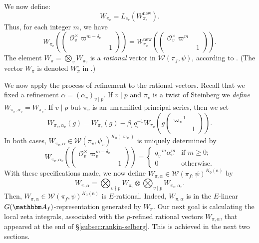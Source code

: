 \documentclass[10pt, twoside]{amsart}
\theoremstyle{plain}
\theoremstyle{definition}
\theoremstyle{remark}
\numberwithin{equation}{subsection}
\def\A{\mathbbm A}
\def\new{\mathrm{new}}
\def\gn{\mathfrak n}
\def\scro{\mathscr O}
\def\calw{\mathcal W}
\def\scro{\mathscr O}
\begin{document}
We now define:
\begin{equation*}
W_{\pi_v} = L_{c_v}(W_{\pi_v}^{\new}).
\end{equation*}
Thus, for each integer $m$, we have
\begin{equation*}
W_{\pi_v}\left(\begin{pmatrix}\scro_v^\times \varpi^{m-\delta_v} & \\ & 1 \end{pmatrix}\right) = W_{\pi_v}^{\new}\left(\begin{pmatrix}\scro_v^\times \varpi^{m} & \\ & 1 \end{pmatrix}\right).
\end{equation*}
The element $W_{\pi} = \bigotimes_v W_{\pi_v}$ is a {\em rational} vector in $\calw(\pi_f,\psi)$, according to \cite[Proposition 3.14]{RaTa}.  (The vector $W_{\pi}$ is denoted $W^{\circ}_{\pi}$ in \cite{RaTa}.)

We now apply the process of refinement to the rational vectors. Recall that we fixed a refinement $\alpha = (\alpha_{v})_{v \mid p}$. If $v \mid p$ and $\pi_v$ is a twist of Steinberg we {\em define} $W_{\pi_v,\alpha_v} = W_{\pi_v}$. If $v \mid p$ but $\pi_v$ is an unramified principal series, then we set 
\begin{equation}\label{eqn:whittaker-refinement}
W_{\pi_v,\alpha_v}(g) = W_{\pi_v}(g) - \beta_v q_v^{-1} W_{\pi_v}\left(g\begin{pmatrix} \varpi_v^{-1} \\ & 1 \end{pmatrix}\right).
\end{equation}
In both cases, $W_{\pi_v,\alpha} \in \mathcal W(\pi_v,\psi_v)^{K_0(\varpi_v)}$ is uniquely determined by
\begin{equation}\label{eqn:refinement-explicit-formula}
W_{\pi_v,\alpha_v}\left(\begin{pmatrix} \scro_v^\times\varpi_v^{m-\delta_v} & \\ & 1 \end{pmatrix}\right) = \begin{cases}
q_v^{-m} \alpha_v^m & \text{if $m \geq 0$;}\\
0 & \text{otherwise}.
\end{cases}
\end{equation}
With these specifications made, we now define $W_{\pi,\alpha} \in \calw(\pi_f,\psi)^{K_0(\gn)}$ by
\begin{equation}\label{eqn:W_pialpha}
W_{\pi, \alpha} = \bigotimes_{v \nmid p} W_{\pi_v} \otimes \bigotimes_{v \mid p } W_{\pi_v, \alpha_v}.
\end{equation}
Then, $W_{\pi,\alpha} \in \calw(\pi_f,\psi)^{K_0(\gn)}$ is $E$-rational.  Indeed, $W_{\pi,\alpha}$ is in the $E$-linear $G(\A_f)$-representation generated by $W_{\pi}$. Our next goal is calculating the local zeta integrals, associated with the $p$-refined rational vectors $W_{\pi,\alpha}$, that appeared at the end of \S \ref{subsec:rankin-selberg}. This is achieved in the next two sections.
\end{document}
